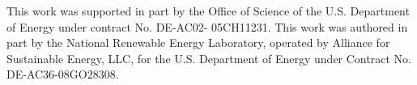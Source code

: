 This work was supported in part by the Office of Science of
the U.S. Department of Energy under contract No. DE-AC02-
05CH11231. This work was authored in part by the National Renewable Energy Laboratory, operated by Alliance for Sustainable Energy, LLC, for the U.S. Department of Energy under Contract No. DE-AC36-08GO28308. 

